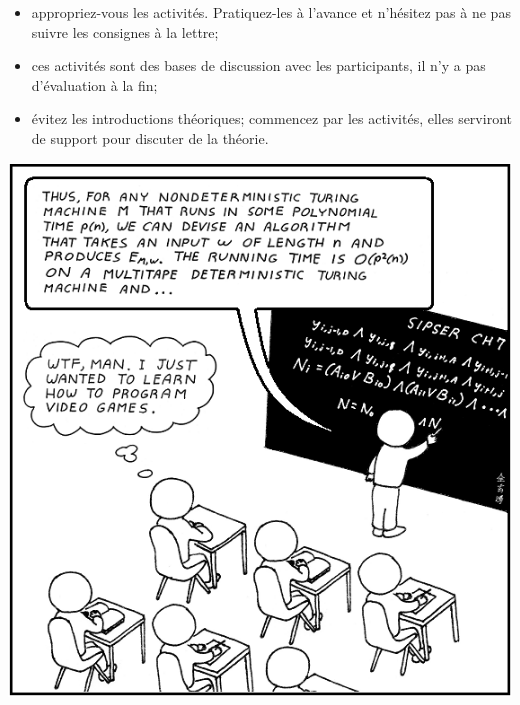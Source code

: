 \documentclass[a5paper,pagesize,DIV=14]{scrbook}
\begin{document}
\begin{itemize}
\item appropriez-vous les activités. Pratiquez-les à l'avance et n'hésitez pas à
  ne pas suivre les consignes à la lettre;
\item ces activités sont des bases de discussion avec les participants, il n'y a
  pas d'évaluation à la fin;
\item évitez les introductions théoriques; commencez par les activités, elles
  serviront de support pour discuter de la théorie.
\end{itemize}

\begin{center}
  \includegraphics[width=0.7\linewidth]{img/computer_science_major.PNG}
  \label{img:CSmajor}
\end{center}





\end{document}
